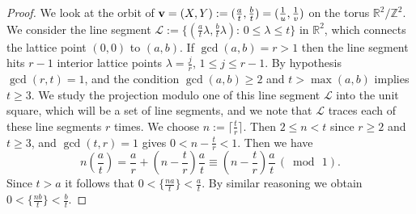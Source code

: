 \documentclass[12pt,letterpaper, reqno]{amsart}
\theoremstyle{definition}
\theoremstyle{remark}
\newcommand{\RR}{\ensuremath{\mathbb{R}}}
\newcommand{\ZZ}{\ensuremath{\mathbb{Z}}}
\newcommand{\sL}{{\mathcal L}}
\newcommand{\bv}{{\bf v}}
\begin{document}
\begin{proof} 
We look at the orbit of $\bv  = (X, Y) :=(\frac{a}{t}, \frac{b}{t}) = (\frac{1}{u}, \frac{1}{v} )$ on the torus $\RR^2/\ZZ^2$.
We consider the line segment  $\sL := \{ (\frac{a}{t} \lambda, \frac{b}{t} \lambda): \, 0 \le  \lambda \le t \}$
in $\RR^2$, which connects the lattice point $(0,0)$ to $(a, b)$. If $\gcd(a, b) = r>1$ then
the line segment hits $r-1$ interior lattice points  $\lambda= \frac{j}{r}$, $1\le  j \le r-1.$ 
By hypothesis $\gcd (r, t)=1$, and the condition $\gcd(a, b)\ge 2$ and $t > \max(a, b)$
implies $t \ge 3$.
We study the projection
modulo one of this line segment $\sL$ into the unit square, which will be a set of line segments, 
and we note that  $\sL$ traces each of these  line segments $r$ times. 
We choose $n := \lceil \frac{t}{r} \rceil$. Then $2 \le n < t$
since $r \ge 2$ and $t \ge 3$, and $\gcd(t, r) =1$ gives
$0 < n - \frac{t}{r} <1$. Then we have
$$
 n(\frac{a}{t}) = \frac{a}{r} + (n- \frac{t}{r}) \frac{a}{t} \equiv (n- \frac{t}{r}) \frac{a}{t} \, (\bmod \, 1).
$$
Since $t > a$ it  follows that $0 < \{ \frac{na}{t} \} < \frac{a}{t}$.
By similar reasoning we obtain $0 < \{ \frac{nb}{t} \} < \frac{b}{t}$.
\end{proof}

\end{document}
